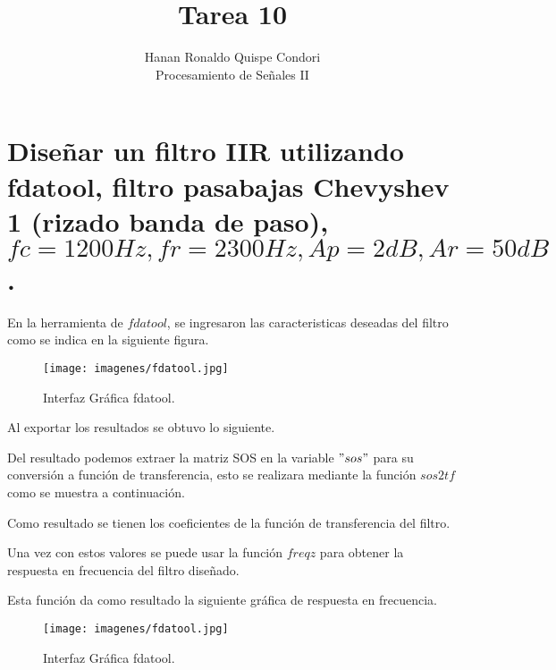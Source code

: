 \documentclass[12pt]{article}
\begin{document}
\title{Tarea 10}
\author{Hanan Ronaldo Quispe Condori\\ %
Procesamiento de Señales II}

\maketitle
\section{Diseñar un filtro IIR utilizando fdatool, filtro pasabajas Chevyshev 1 (rizado banda de paso), $fc=1200Hz,fr=2300Hz,Ap=2dB,Ar=50dB$.}

En la herramienta de $fdatool$, se ingresaron las caracteristicas deseadas del filtro como se indica en la siguiente figura.
\begin{figure}[h]
    \centering
    \texttt{[image: imagenes/fdatool.jpg]}
    \caption{Interfaz Gráfica fdatool.}
    \label{fig:fda}
\end{figure}

Al exportar los resultados se obtuvo lo siguiente.


Del resultado podemos extraer la matriz SOS en la variable $"sos"$ para su conversión a función de transferencia, esto se realizara mediante la función $sos2tf$  como se muestra a continuación.



Como resultado se tienen los coeficientes de la función de transferencia del filtro.



Una vez con estos valores se puede usar la función $freqz$ para obtener la respuesta en frecuencia del filtro diseñado.



Esta función da como resultado la siguiente gráfica de respuesta en frecuencia.

\begin{figure}[h]
    \centering
    \texttt{[image: imagenes/fdatool.jpg]}
    \caption{Interfaz Gráfica fdatool.}
    \label{fig:fda}
\end{figure}
\end{document}

